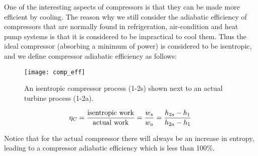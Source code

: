 One of the interesting aspects of compressors is that they can be made more efficient by cooling. The reason why we still consider the adiabatic efficiency of compressors that are normally found in refrigeration, air-condition and heat pump systems is that it is considered to be impractical to cool them. Thus the ideal compressor (absorbing a minimum of power) is considered to be isentropic, and we define compressor adiabatic efficiency as follows:
\nopagebreak[4]%
\begin{figure}[H]
  \centering
  \texttt{[image: comp\_eff]}
  \caption{An isentropic compressor process (1-2s) shown next to an actual turbine process (1-2a).}
  \label{fig:turbine_eff}
\end{figure}

\begin{equation}\label{eq:comp_eff}
  \eta_C = \frac{\rm isentropic\ work}{\rm actual\ work} = \frac{w_s}{w_a} = \frac{h_{2s} - h_{1}}{h_{2a} - h_{1}}
\end{equation}

Notice that for the actual compressor there will always be an increase in entropy, leading to a compressor adiabatic efficiency which is less than 100\%.


